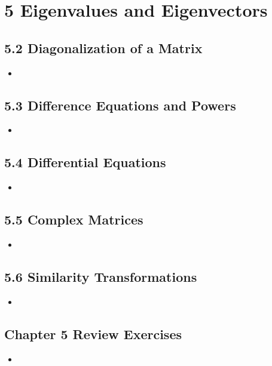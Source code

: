 \chapter{5 Eigenvalues and Eigenvectors}

\section{5.2 Diagonalization of a Matrix}
\begin{itemize}
  \item []


\end{itemize}

\section{5.3 Difference Equations and Powers}
\begin{itemize}
  \item []


\end{itemize}

\section{5.4 Differential Equations}
\begin{itemize}
  \item []


\end{itemize}

\section{5.5 Complex Matrices}
\begin{itemize}
  \item []


\end{itemize}

\section{5.6 Similarity Transformations}
\begin{itemize}
  \item []


\end{itemize}

\section{Chapter 5 Review Exercises}
\begin{itemize}
  \item []


\end{itemize}


